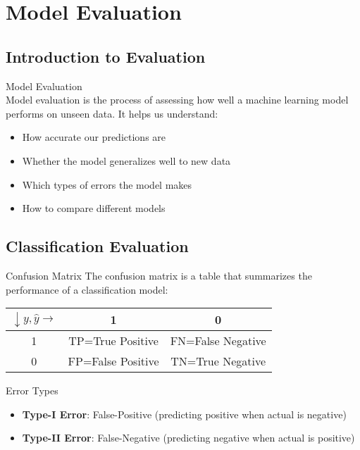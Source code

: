 \section{Model Evaluation}

\subsection{Introduction to Evaluation}

\begin{definition}{Model Evaluation}\\
Model evaluation is the process of assessing how well a machine learning model performs on unseen data. It helps us understand:
\begin{itemize}
    \item How accurate our predictions are
    \item Whether the model generalizes well to new data
    \item Which types of errors the model makes
    \item How to compare different models
\end{itemize}
\end{definition}

\subsection{Classification Evaluation}

\begin{definition}{Confusion Matrix}
The confusion matrix is a table that summarizes the performance of a classification model:
\begin{center}
\begin{tabular}{|c|c|c|}
\hline
$\downarrow y, \hat{y} \rightarrow$ & 1 & 0 \\
\hline
1 & TP=True Positive & FN=False Negative \\
\hline
0 & FP=False Positive & TN=True Negative \\
\hline
\end{tabular}
\end{center}
\end{definition}

\begin{definition}{Error Types}
\begin{itemize}
    \item \textbf{Type-I Error}: False-Positive (predicting positive when actual is negative)
    \item \textbf{Type-II Error}: False-Negative (predicting negative when actual is positive)
\end{itemize}
\end{definition}

